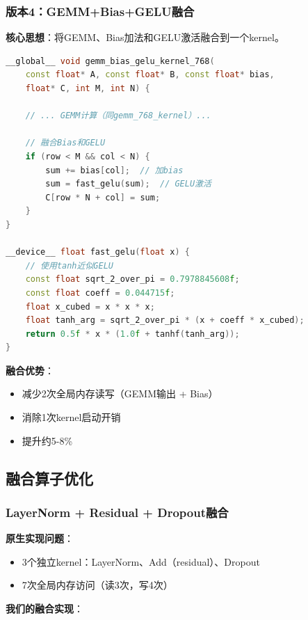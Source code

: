 \documentclass[12pt,a4paper]{article}
\begin{document}
\subsubsection{版本4：GEMM+Bias+GELU融合}

\textbf{核心思想}：将GEMM、Bias加法和GELU激活融合到一个kernel。

\begin{lstlisting}[language=C++,caption=GEMM+Bias+GELU融合]
__global__ void gemm_bias_gelu_kernel_768(
    const float* A, const float* B, const float* bias,
    float* C, int M, int N) {
    
    // ... GEMM计算（同gemm_768_kernel）...
    
    // 融合Bias和GELU
    if (row < M && col < N) {
        sum += bias[col];  // 加bias
        sum = fast_gelu(sum);  // GELU激活
        C[row * N + col] = sum;
    }
}

__device__ float fast_gelu(float x) {
    // 使用tanh近似GELU
    const float sqrt_2_over_pi = 0.7978845608f;
    const float coeff = 0.044715f;
    float x_cubed = x * x * x;
    float tanh_arg = sqrt_2_over_pi * (x + coeff * x_cubed);
    return 0.5f * x * (1.0f + tanhf(tanh_arg));
}
\end{lstlisting}

\textbf{融合优势}：
\begin{itemize}
    \item 减少2次全局内存读写（GEMM输出 + Bias）
    \item 消除1次kernel启动开销
    \item 提升约5-8\%
\end{itemize}

\subsection{融合算子优化}

\subsubsection{LayerNorm + Residual + Dropout融合}

\textbf{原生实现问题}：
\begin{itemize}
    \item 3个独立kernel：LayerNorm、Add（residual）、Dropout
    \item 7次全局内存访问（读3次，写4次）
\end{itemize}

\textbf{我们的融合实现}：
\end{document}
